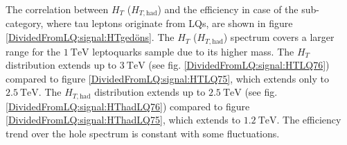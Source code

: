 %
%
The correlation between $H_{T}$ ($H_{T,\text{had}}$) and the efficiency in case of the sub-category, where tau leptons originate from LQs, are shown in figure \ref{DividedFromLQ:signal:HTgedöns}. The $H_T$ ($H_{T,\text{had}}$) spectrum covers a larger range for the $\SI{1}{\tera\electronvolt}$ leptoquarks sample due to its higher mass. The $H_T$ distribution extends up to $\SI{3}{\tera\electronvolt}$ (see fig. \ref{DividedFromLQ:signal:HTLQ76}) compared to figure \ref{DividedFromLQ:signal:HTLQ75}, which extends only to $\SI{2.5}{\tera\electronvolt}$. The $H_{T,\text{had}}$ distribution extends up to $\SI{2.5}{\tera\electronvolt}$ (see fig. \ref{DividedFromLQ:signal:HThadLQ76}) compared to figure \ref{DividedFromLQ:signal:HThadLQ75}, which extends to $\SI{1.2}{\tera\electronvolt}$. The efficiency trend over the hole spectrum is constant with some fluctuations.\newline
%
